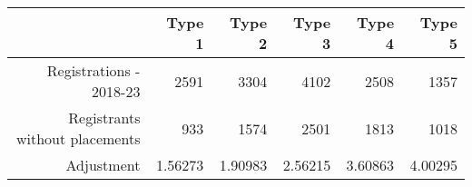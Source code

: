 \begin{tabular}{rrrrrr}
  \hline
   & \textbf{Type 1} & \textbf{Type 2} & \textbf{Type 3} & \textbf{Type 4} & \textbf{Type 5} \\\hline
  Registrations - 2018-23 & 2591 & 3304 & 4102 & 2508 & 1357 \\
  Registrants without placements & 933 & 1574 & 2501 & 1813 & 1018 \\
  Adjustment & 1.56273 & 1.90983 & 2.56215 & 3.60863 & 4.00295 \\\hline
\end{tabular}
